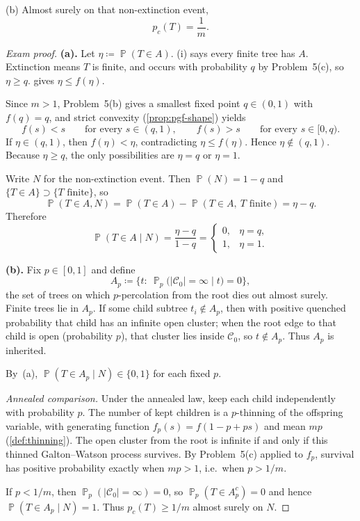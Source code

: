 \documentclass[11pt,a4paper]{article}
\DeclareMathOperator{\Pbb}{\mathbb{P}}
\begin{document}
(b) Almost surely on that non-extinction event,
\[
p_c(T)=\frac{1}{m}.
\]

\begin{proof}[Exam proof]
\textbf{(a).}
Let \(\eta\coloneqq\Pbb(T\in A)\). (i) says every finite tree has \(A\). Extinction means \(T\) is finite, and occurs with probability \(q\) by Problem~5(c), so \(\eta\ge q\).  gives \(\eta\le f(\eta)\).

Since \(m>1\), Problem~5(b) gives a smallest fixed point \(q\in(0,1)\) with \(f(q)=q\), and strict convexity (\cref{prop:pgf-shape}) yields
\[
f(s)<s
\qquad\text{for every }s\in(q,1),
\qquad
f(s)>s
\qquad\text{for every }s\in[0,q).
\]
If \(\eta\in(q,1)\), then \(f(\eta)<\eta\), contradicting \(\eta\le f(\eta)\). Hence \(\eta\notin(q,1)\). Because \(\eta\ge q\), the only possibilities are \(\eta=q\) or \(\eta=1\).

Write \(N\) for the non-extinction event. Then \(\Pbb(N)=1-q\) and \(\{T\in A\}\supset\{T\text{ finite}\}\), so
\[
\Pbb(T\in A, N)
=
\Pbb(T\in A)-\Pbb(T\in A,\ T\text{ finite})
=
\eta-q.
\]
Therefore
\[
\Pbb(T\in A\mid N)
=
\frac{\eta-q}{1-q}
=
\begin{cases}
0, & \eta=q,\\
1, & \eta=1.
\end{cases}
\]

\textbf{(b).}
Fix \(p\in[0,1]\) and define
\[
A_p
\coloneqq
\bigl\{t:\ \Pbb_p\bigl(|\mathcal{C}_0|=\infty\mid t\bigr)=0\bigr\},
\]
the set of trees on which \(p\)-percolation from the root dies out almost surely. Finite trees lie in \(A_p\). If some child subtree \(t_i\notin A_p\), then with positive quenched probability that child has an infinite open cluster; when the root edge to that child is open (probability \(p\)), that cluster lies inside \(\mathcal{C}_0\), so \(t\notin A_p\). Thus \(A_p\) is inherited.

By~(a), \(\Pbb(T\in A_p\mid N)\in\{0,1\}\) for each fixed \(p\).

\emph{Annealed comparison.}
Under the annealed law, keep each child independently with probability \(p\). The number of kept children is a \(p\)-thinning of the offspring variable, with generating function \(f_p(s)=f(1-p+ps)\) and mean \(mp\) (\cref{def:thinning}). The open cluster from the root is infinite if and only if this thinned Galton--Watson process survives. By Problem~5(c) applied to \(f_p\), survival has positive probability exactly when \(mp>1\), i.e.\ when \(p>1/m\).

If \(p<1/m\), then \(\Pbb_p(|\mathcal{C}_0|=\infty)=0\), so \(\Pbb_p(T\in A_p^c)=0\) and hence \(\Pbb(T\in A_p\mid N)=1\). Thus \(p_c(T)\ge 1/m\) almost surely on \(N\).


\end{proof}
\end{document}
